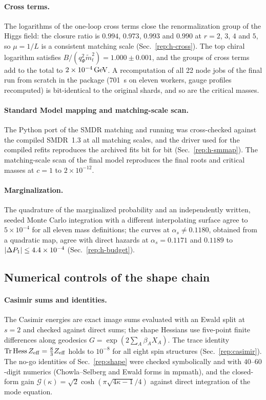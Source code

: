 \paragraph{Cross terms.}
The logarithms of the one-loop cross terms close the renormalization group of the Higgs field: the closure ratio is $0.994$, $0.973$, $0.993$ and $0.990$ at $r=2$, $3$, $4$ and $5$, so $\mu=1/L$ is a consistent matching scale (Sec.~\ref{rep:h-cross}). %
The top chiral logarithm satisfies $B/(q_\Phi^2\tilde m_t^2)=1.000\pm0.001$, and the groups of cross terms add to the total to $2\times10^{-4}\,\mathrm{GeV}$. %
A recomputation of all 22 node jobs of the final run from scratch in the package (701~s on eleven workers, gauge profiles recomputed) is bit-identical to the original shards, and so are the critical masses.

\paragraph{Standard Model mapping and matching-scale scan.}
The Python port of the SMDR matching and running was cross-checked against the compiled SMDR~1.3 at all matching scales, and the driver used for the compiled refits reproduces the archived fits bit for bit (Sec.~\ref{rep:h-smmap}).
The matching-scale scan of the final model reproduces the final roots and critical masses at $c=1$ to $2\times10^{-12}$. %

\paragraph{Marginalization.}
The quadrature of the marginalized probability and an independently written, seeded Monte Carlo integration with a different interpolating surface agree to $5\times10^{-4}$ for all eleven mass definitions; the curves at $\alpha_s\neq0.1180$, obtained from a quadratic map, agree with direct hazards at $\alpha_s=0.1171$ and $0.1189$ to $|\Delta P_1|\le4.4\times10^{-4}$ (Sec.~\ref{rep:h-budget}). %

\subsection{Numerical controls of the shape chain}\label{sec:v20-shape}

\paragraph{Casimir sums and identities.}
The Casimir energies are exact image sums evaluated with an Ewald split at $s=2$ and checked against direct sums; the shape Hessians use five-point finite differences along geodesics $G=\exp(2\sum_A\beta_AX_A)$.
The trace identity ${\rm Tr}\,{\rm Hess}\,Z_{\rm eff}=\frac83Z_{\rm eff}$ holds to $10^{-8}$ for all eight spin structures (Sec.~\ref{rep:casimir}). %
The no-go identities of Sec.~\ref{rep:shape} were checked symbolically and with $40$--$60$-digit numerics (Chowla--Selberg and Ewald forms in mpmath), and the closed-form gain $\mathcal G(\kappa)=\sqrt2\cosh(\pi\sqrt{4\kappa-1}/4)$ against direct integration of the mode equation. %

